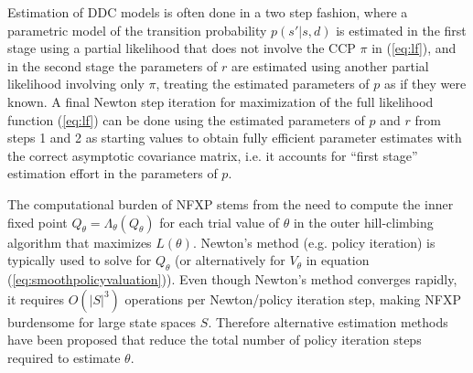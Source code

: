 Estimation of DDC models is often done in a two step fashion, where a parametric model of the transition probability $p(s'|s,d)$
is estimated in the first stage using a partial likelihood that does not involve the CCP $\pi$ in (\ref{eq:lf}), and in  
the second stage the parameters of $r$ are estimated using another partial likelihood involving only $\pi$, treating the estimated
parameters of $p$ as if they were known. A final Newton step iteration for maximization of the full likelihood
function (\ref{eq:lf}) can be done using the estimated parameters of $p$ and $r$ from steps 1 and 2 as
starting  values to obtain fully efficient
parameter estimates with the correct asymptotic covariance matrix, i.e. it accounts for ``first stage'' estimation effort
in the parameters of $p$.

The computational burden of NFXP stems from the need to compute the inner fixed point $Q_\theta=\Lambda_\theta(Q_\theta)$ 
for each trial value of $\theta$ in the outer hill-climbing algorithm that maximizes $L(\theta)$. 
Newton's method (e.g. policy iteration) is typically used to solve for $Q_\theta$ (or alternatively for $V_\theta$ in equation
(\ref{eq:smoothpolicyvaluation})). Even though  Newton's method converges rapidly, it requires $O(|S|^3)$ operations per Newton/policy
iteration step, making NFXP burdensome for large state spaces $S$. Therefore alternative estimation methods have been proposed that 
reduce the total number of policy iteration steps required to estimate $\theta$.


